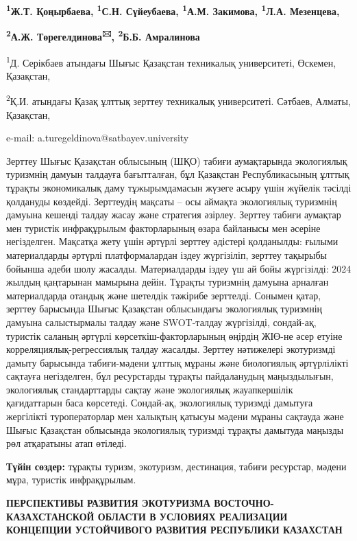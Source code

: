 {\bfseries \textsuperscript{1}Ж.Т. Қоңырбаева, \textsuperscript{1}С.Н.
Сүйеубаева, \textsuperscript{1}А.М. Закимова, \textsuperscript{1}Л.А.
Мезенцева,}

{\bfseries \textsuperscript{2}А.Ж. Төрегелдинова\textsuperscript{🖂},
\textsuperscript{2}Б.Б. Амралинова}

\textsuperscript{1}Д. Серікбаев атындағы Шығыс Қазақстан техникалық
университеті, Өскемен, Қазақстан,

\textsuperscript{2}Қ.И. атындағы Қазақ ұлттық зерттеу техникалық
университеті. Сәтбаев, Алматы, Қазақстан,

e-mail: a.turegeldinova@satbayev.university

Зерттеу Шығыс Қазақстан облысының (ШҚО) табиғи аумақтарында экологиялық
туризмнің дамуын талдауға бағытталған, бұл Қазақстан Республикасының
ұлттық тұрақты экономикалық даму тұжырымдамасын жүзеге асыру үшін
жүйелік тәсілді қолдануды көздейді. Зерттеудің мақсаты -- осы аймақта
экологиялық туризмнің дамуына кешенді талдау жасау және стратегия
әзірлеу. Зерттеу табиғи аумақтар мен туристік инфрақұрылым факторларының
өзара байланысы мен әсеріне негізделген. Мақсатқа жету үшін әртүрлі
зерттеу әдістері қолданылды: ғылыми материалдарды әртүрлі
платформалардан іздеу жүргізіліп, зерттеу тақырыбы бойынша әдеби шолу
жасалды. Материалдарды іздеу үш ай бойы жүргізілді: 2024 жылдың
қаңтарынан мамырына дейін. Тұрақты туризмнің дамуына арналған
материалдарда отандық және шетелдік тәжірибе зерттелді. Сонымен қатар,
зерттеу барысында Шығыс Қазақстан облысындағы экологиялық туризмнің
дамуына салыстырмалы талдау және SWOT-талдау жүргізілді, сондай-ақ,
туристік саланың әртүрлі көрсеткіш-факторларының өңірдің ЖІӨ-не әсер
етуіне корреляциялық-регрессиялық талдау жасалды. Зерттеу нәтижелері
экотуризмді дамыту барысында табиғи-мәдени ұлттық мұраны және
биологиялық әртүрлілікті сақтауға негізделген, бұл ресурстарды тұрақты
пайдаланудың маңыздылығын, экологиялық стандарттарды сақтау және
экологиялық жауапкершілік қағидаттарын баса көрсетеді. Сондай-ақ,
экологиялық туризмді дамытуға жергілікті туроператорлар мен халықтың
қатысуы мәдени мұраны сақтауда және Шығыс Қазақстан облысында
экологиялық туризмді тұрақты дамытуда маңызды рөл атқаратыны атап
өтіледі.

{\bfseries Түйін сөздер:} тұрақты туризм, экотуризм, дестинация, табиғи
ресурстар, мәдени мұра, туристік инфрақұрылым.

{\bfseries ПЕРСПЕКТИВЫ РАЗВИТИЯ ЭКОТУРИЗМА ВОСТОЧНО-КАЗАХСТАНСКОЙ ОБЛАСТИ В
УСЛОВИЯХ РЕАЛИЗАЦИИ КОНЦЕПЦИИ УСТОЙЧИВОГО РАЗВИТИЯ РЕСПУБЛИКИ КАЗАХСТАН}

